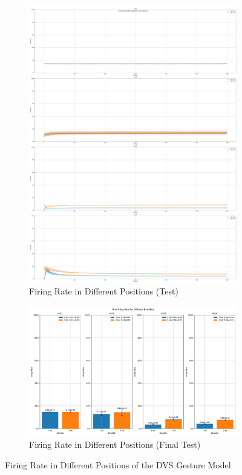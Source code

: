 \begin{figure}[H]
\begin{subfigure}[H]{0.48\textwidth}
                \includegraphics[width=\textwidth]{../firerate/DVSGesture/plots/dvsgesture_test_firerate.pdf}
                \caption{Firing Rate in Different Positions (Test)}
            \end{subfigure}
            \hfill
            \begin{subfigure}[H]{\textwidth}
                \centering
                \includegraphics[width=\textwidth]{../firerate/DVSGesture/plots/dvsgesture_final_firerate.pdf}
                \caption{Firing Rate in Different Positions (Final Test)}
            \end{subfigure}
            \caption{Firing Rate in Different Positions of the DVS Gesture Model}
        \end{figure}

